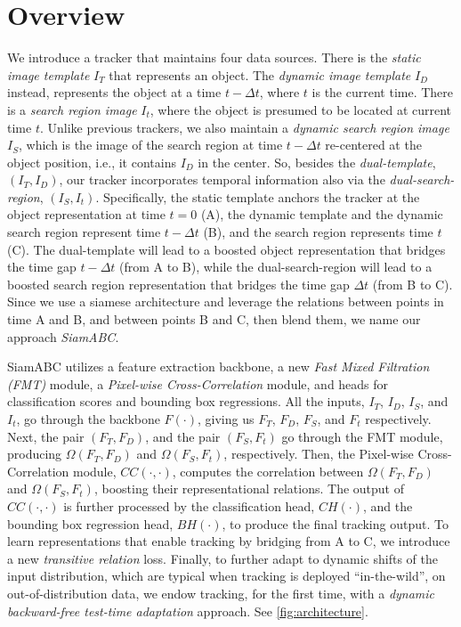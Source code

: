 \section{Overview} 
We introduce a tracker that maintains four data sources. There is the \emph{static image template} $I_T$ that represents an object. The \emph{dynamic image template} $I_D$ instead, represents the object at a time $t - \Delta t$, where $t$ is the current time.
There is a \emph{search region image} $I_t$, where the object is presumed to be located at current time $t$. Unlike previous trackers, we also maintain a \emph{dynamic search region image} $I_{S}$, which is the image of the search region at time $t - \Delta t$ re-centered at the object position, i.e., it contains $I_D$ in the center. So, besides the \emph{dual-template}, $(I_T, I_D)$, our tracker incorporates temporal information also via the \emph{dual-search-region}, $(I_S, I_t)$. Specifically, the static template anchors the tracker at the object representation at time $t=0$ (A), the dynamic template and the dynamic search region represent time $t - \Delta t$ (B), and the search region represents time $t$ (C). The dual-template will lead to a boosted object representation that bridges the time gap $t - \Delta t$ (from A to B), while the dual-search-region will lead to a boosted search region representation that bridges the time gap $\Delta t$ (from B to C). Since we use a siamese architecture and leverage the relations between points in time A and B, and between points B and C, then blend them, we name our approach \emph{SiamABC}.

SiamABC utilizes a feature extraction backbone, a new \emph{Fast Mixed Filtration (FMT)} module, a \emph{Pixel-wise Cross-Correlation} module, and heads for classification scores and bounding box regressions. All the inputs, $I_T$, $I_D$, $I_{S}$, and $I_t$, go through the backbone $F(\cdot)$, giving us $F_T$, $F_D$, $F_S$, and $F_t$ respectively. Next, the pair $(F_T, F_D)$, and the pair $(F_S, F_t)$ go through the FMT module, producing $\Omega(F_T,F_D)$ and $\Omega(F_S,F_t)$, respectively.
Then, the Pixel-wise Cross-Correlation module, $CC(\cdot, \cdot)$, computes the correlation between $\Omega(F_T,F_D)$ and $\Omega(F_S,F_t)$, boosting their representational relations. The output of $CC(\cdot, \cdot)$ is further processed by the classification head, $CH(\cdot)$, and the bounding box regression head, $BH(\cdot)$, to produce the final tracking output. To learn representations that enable tracking by bridging from A to C, we introduce a new \emph{transitive relation} loss. Finally, to further adapt to dynamic shifts of the input distribution, which are typical when tracking is deployed ``in-the-wild'', on out-of-distribution data, we endow tracking, for the first time, with a \emph{dynamic backward-free test-time adaptation} approach. See \ref{fig:architecture}. 


